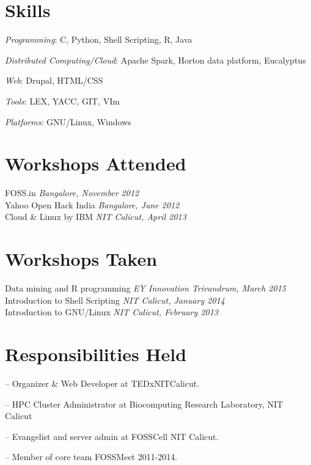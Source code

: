 \documentclass[margin,line]{resume}
\begin{document}
\begin{resume}
   \section{\mysidestyle Skills} 
    	\begin{list2}
	\item \textit{Programming}: C, Python, Shell Scripting, R, Java
	\item \textit{Distributed Computing/Cloud}: Apache Spark, Horton data platform, Eucalyptus	
	\item \textit{Web}: Drupal, HTML/CSS	
	\item \textit{Tools}: LEX, YACC, GIT, VIm
	\item \textit{Platforms}: GNU/Linux, Windows
	\end{list2}


    \section{\mysidestyle Workshops Attended} 
	FOSS.in \hfill \textit{Bangalore, November 2012}  \\%
    Yahoo Open Hack India \hfill \textit{Bangalore, June 2012}    \\
    Cloud \& Linux by IBM \hfill \textit{NIT Calicut, April 2013}    \\

            


    \section{\mysidestyle Workshops Taken} 
	Data mining and R programming \hfill \textit{EY Innovation Trivandrum, March 2015}    \\
	Introduction to Shell Scripting \hfill \textit{NIT Calicut, January 2014}    \\    	
	Introduction to GNU/Linux \hfill \textit{NIT Calicut, February 2013}    \\
		    			

    \section{\mysidestyle Responsibilities Held } 
	\begin{list2}
	\item[--] Organizer \& Web Developer at TEDxNITCalicut.
	\item[--] HPC Cluster Administrator at Biocomputing Research Laboratory, NIT Calicut
	\item[--] Evangelist and server admin at FOSSCell NIT Calicut.	
	\item[--] Member of core team FOSSMeet 2011-2014.
	

\end{list2}
\end{resume}
\end{document}
